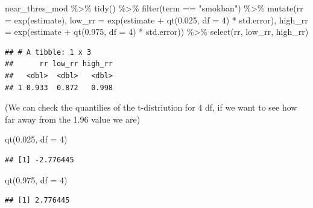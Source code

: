 \documentclass[
]{book}
\newenvironment{Shaded}{\begin{snugshade}}{\end{snugshade}}
\newcommand{\AttributeTok}[1]{\textcolor[rgb]{0.77,0.63,0.00}{#1}}
\newcommand{\DecValTok}[1]{\textcolor[rgb]{0.00,0.00,0.81}{#1}}
\newcommand{\FloatTok}[1]{\textcolor[rgb]{0.00,0.00,0.81}{#1}}
\newcommand{\FunctionTok}[1]{\textcolor[rgb]{0.00,0.00,0.00}{#1}}
\newcommand{\NormalTok}[1]{#1}
\newcommand{\SpecialCharTok}[1]{\textcolor[rgb]{0.00,0.00,0.00}{#1}}
\newcommand{\StringTok}[1]{\textcolor[rgb]{0.31,0.60,0.02}{#1}}
\begin{document}
\begin{Shaded}
\begin{Highlighting}[]
\NormalTok{near\_thres\_mod }\SpecialCharTok{\%\textgreater{}\%} 
  \FunctionTok{tidy}\NormalTok{() }\SpecialCharTok{\%\textgreater{}\%} 
  \FunctionTok{filter}\NormalTok{(term }\SpecialCharTok{==} \StringTok{"smokban"}\NormalTok{) }\SpecialCharTok{\%\textgreater{}\%} 
  \FunctionTok{mutate}\NormalTok{(}\AttributeTok{rr =} \FunctionTok{exp}\NormalTok{(estimate), }
         \AttributeTok{low\_rr =} \FunctionTok{exp}\NormalTok{(estimate }\SpecialCharTok{+} \FunctionTok{qt}\NormalTok{(}\FloatTok{0.025}\NormalTok{, }\AttributeTok{df =} \DecValTok{4}\NormalTok{) }\SpecialCharTok{*}\NormalTok{ std.error), }
         \AttributeTok{high\_rr =} \FunctionTok{exp}\NormalTok{(estimate }\SpecialCharTok{+} \FunctionTok{qt}\NormalTok{(}\FloatTok{0.975}\NormalTok{, }\AttributeTok{df =} \DecValTok{4}\NormalTok{) }\SpecialCharTok{*}\NormalTok{ std.error)) }\SpecialCharTok{\%\textgreater{}\%} 
  \FunctionTok{select}\NormalTok{(rr, low\_rr, high\_rr)}
\end{Highlighting}
\end{Shaded}

\begin{verbatim}
## # A tibble: 1 x 3
##      rr low_rr high_rr
##   <dbl>  <dbl>   <dbl>
## 1 0.933  0.872   0.998
\end{verbatim}

(We can check the quantilies of the t-distriution for 4 df, if we want to see how far away from the 1.96 value we are)

\begin{Shaded}
\begin{Highlighting}[]
\FunctionTok{qt}\NormalTok{(}\FloatTok{0.025}\NormalTok{, }\AttributeTok{df =} \DecValTok{4}\NormalTok{)}
\end{Highlighting}
\end{Shaded}

\begin{verbatim}
## [1] -2.776445
\end{verbatim}

\begin{Shaded}
\begin{Highlighting}[]
\FunctionTok{qt}\NormalTok{(}\FloatTok{0.975}\NormalTok{, }\AttributeTok{df =} \DecValTok{4}\NormalTok{) }
\end{Highlighting}
\end{Shaded}

\begin{verbatim}
## [1] 2.776445
\end{verbatim}
\end{document}
